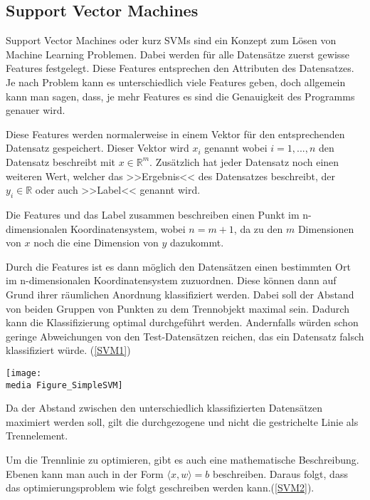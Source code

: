 \subsection{Support Vector Machines}
\author{David Steinmann}
Support Vector Machines oder kurz SVMs sind ein Konzept zum Lösen von Machine Learning Problemen.
Dabei werden für alle Datensätze zuerst gewisse Features festgelegt. Diese Features entsprechen den Attributen des Datensatzes. Je nach Problem kann es unterschiedlich viele Features geben, doch allgemein kann man sagen, dass, je mehr Features es sind die Genauigkeit des Programms genauer wird.

Diese Features werden normalerweise in einem Vektor für den entsprechenden Datensatz gespeichert.
Dieser Vektor wird $x_{i}$ genannt wobei $i = 1, ..., n$ den Datensatz beschreibt mit  $x \in  \mathbb{R}^m$.
Zusätzlich hat jeder Datensatz noch einen weiteren Wert, welcher das >>Ergebnis<< des Datensatzes beschreibt, der $y_{i} \in \mathbb{R}$ oder auch >>Label<< genannt wird.

Die Features und das Label zusammen beschreiben einen Punkt im n-dimensionalen Koordinatensystem, wobei $n = m + 1$, da zu den $m$ Dimensionen von $x$ noch die eine Dimension von $y$ dazukommt.

Durch die Features ist es dann möglich den Datensätzen einen bestimmten Ort im n-dimensionalen Koordinatensystem zuzuordnen. Diese können dann auf Grund ihrer räumlichen Anordnung klassifiziert werden. Dabei soll der Abstand von beiden Gruppen von Punkten zu dem Trennobjekt maximal sein. Dadurch kann die Klassifizierung optimal durchgeführt werden. Andernfalls würden schon geringe Abweichungen von den Test-Datensätzen reichen, das ein Datensatz falsch klassifiziert würde. (\ref{SVM1}) 


\begin{dsafigure}
\begin{center}
	\label{SVM1}
	\texttt{[image: \\media Figure\_SimpleSVM]}
	\caption{Da der Abstand zwischen den unterschiedlich klassifizierten Datensätzen maximiert werden soll, gilt die durchgezogene und nicht die gestrichelte Linie als Trennelement.}
	\end{center}
\end{dsafigure}


Um die Trennlinie zu optimieren, gibt es auch eine mathematische Beschreibung. Ebenen kann man auch in der Form $\langle x, w \rangle = b $ beschreiben. Daraus folgt, dass das optimierungsproblem wie folgt geschreiben werden kann.(\ref{SVM2}).

